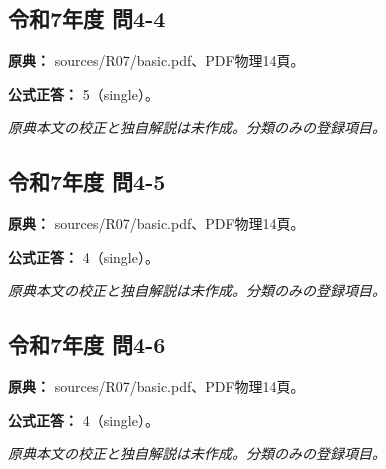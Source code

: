 \subsection{令和7年度 問4-4}
\label{q:r07-reg-basic-4-4}

\noindent\textbf{原典：} sources/R07/basic.pdf、PDF物理14頁。

\textbf{公式正答：} 5（single）。

\par\textit{原典本文の校正と独自解説は未作成。分類のみの登録項目。}

\subsection{令和7年度 問4-5}
\label{q:r07-reg-basic-4-5}

\noindent\textbf{原典：} sources/R07/basic.pdf、PDF物理14頁。

\textbf{公式正答：} 4（single）。

\par\textit{原典本文の校正と独自解説は未作成。分類のみの登録項目。}

\subsection{令和7年度 問4-6}
\label{q:r07-reg-basic-4-6}

\noindent\textbf{原典：} sources/R07/basic.pdf、PDF物理14頁。

\textbf{公式正答：} 4（single）。

\par\textit{原典本文の校正と独自解説は未作成。分類のみの登録項目。}
